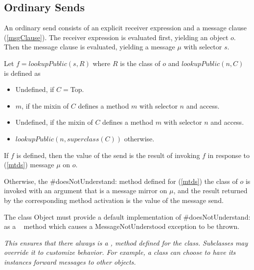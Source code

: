 \documentclass{article}
\newcommand{\code}[1]{{\sf #1}}
\begin{document}
\subsection{Ordinary Sends}
\label{normal}

An ordinary send consists of an explicit receiver expression and a message clause (\ref{msgClause}). The receiver expression is evaluated first, yielding an object $o$. Then the message clause is evaluated, yielding a message $\mu$ with selector $s$.

Let $f = lookupPublic(s, R)$ where $R$ is the class of $o$ and $lookupPublic(n, C)$ is defined as
\begin{itemize}
\item Undefined, if $C =$\code{Top}.
\item $m$, if the mixin of $C$ defines a method $m$ with selector $n$ and \PUBLIC{} access.
\item Undefined, if the mixin of $C$ defines a method $m$ with selector $n$ and \PROTECTED{} access.
\item $lookupPublic(n, superclass(C))$ otherwise.
\end{itemize}

If $f$ is defined, then the value of the send is the result of invoking $f$ in response to (\ref{mtds}) message $\mu$ on $o$. 

Otherwise, the \code{\#doesNotUnderstand:} method  defined for (\ref{mtds}) the class of $o$ is invoked
with an argument that is a message mirror on $\mu$, and the result  returned by the corresponding method activation is the value of the message send.

The class \code{Object} must provide a default implementation of \code{\#doesNotUnderstand:} as a \ \PROTECTED{} method which causes a \code{MessageNotUnderstood} exception to be thrown.

{\it
This ensures that there always is a , method defined for the class.
Subclasses may override it to customize behavior. For example, a class can choose to have its instances  forward messages to other objects.
}
\end{document}
